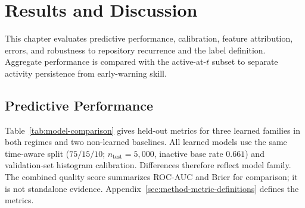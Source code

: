 \chapter{Results and Discussion}
\label{chap:evaluation}

This chapter evaluates predictive performance, calibration, feature attribution,
errors, and robustness to repository recurrence and the label definition.
Aggregate performance is compared with the active-at-\(t\) subset to separate
activity persistence from early-warning skill.

\section{Predictive Performance}
\label{sec:results-performance}

Table~\ref{tab:model-comparison} gives held-out metrics for three learned
families in both regimes and two non-learned baselines. All learned models use
the same time-aware split (\(75/15/10\);
\(n_\text{test}=5{,}000\), inactive base rate \(0.661\)) and validation-set
histogram calibration. Differences therefore reflect model family. The combined
quality score summarizes ROC-AUC and Brier for comparison; it is not standalone
evidence. Appendix~\ref{sec:method-metric-definitions} defines the metrics.

